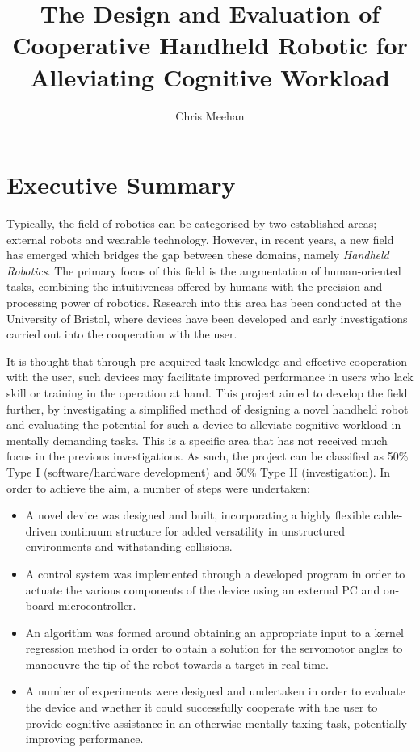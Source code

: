 \documentclass[11pt]{article}
\title{The Design and Evaluation of Cooperative Handheld Robotic for Alleviating Cognitive Workload}
\author{Chris Meehan}
\begin{document}




\clearpage
\setcounter{page}{1}

\pagestyle{roman}
\renewcommand{\thepage}{\roman{page}}%
\section*{Executive Summary}

Typically, the field of robotics can be categorised by two established areas; external robots and wearable technology. However, in recent years, a new field has emerged which bridges the gap between these domains, namely \textit{Handheld Robotics}. The primary focus of this field is the augmentation of human-oriented tasks, combining the intuitiveness offered by humans with the precision and processing power of robotics. Research into this area has been conducted at the University of Bristol, where devices have been developed and early investigations carried out into the cooperation with the user.

It is thought that through pre-acquired task knowledge and effective cooperation with the user, such devices may facilitate improved performance in users who lack skill or training in the operation at hand. This project aimed to develop the field further, by investigating a simplified method of designing a novel handheld robot and evaluating the potential for such a device to alleviate cognitive workload in mentally demanding tasks. This is a specific area that has not received much focus in the previous investigations. As such, the project can be classified as 50\% Type I (software/hardware development) and 50\% Type II (investigation). In order to achieve the aim, a number of steps were undertaken:
\begin{itemize}
\item{A novel device was designed and built, incorporating a highly flexible cable-driven continuum structure for added versatility in unstructured environments and withstanding collisions.}
\item{A control system was implemented through a developed program in order to actuate the various components of the device using an external PC and on-board microcontroller.}
\item{An algorithm was formed around obtaining an appropriate input to a kernel regression method in order to obtain a solution for the servomotor angles to manoeuvre the tip of the robot towards a target in real-time.}
\item{A number of experiments were designed and undertaken in order to evaluate the device and whether it could successfully cooperate with the user to provide cognitive assistance in an otherwise mentally taxing task, potentially improving performance.}
\end{itemize}  
\end{document}
